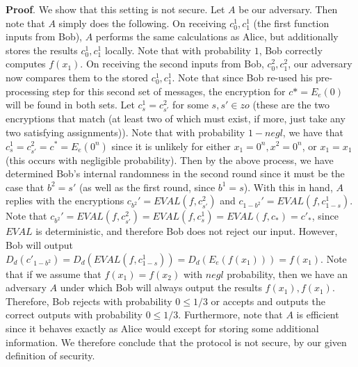 \documentclass{article}
\begin{document}
\begin{enumerate}[noitemsep,topsep=\mdcompacttopsep,label=\alph*.]
\begin{mdbmarginx}{1ex}{0pt}{1ex}{0pt}%
\noindent{}\textbf{Proof}.  We show that this setting is not secure. Let $A$ be our adversary. Then note that $A$ simply does
the following. On receiving $c_0^1,c_1^1$ (the first function inputs from Bob), $A$ performs
the same calculations as Alice, but additionally stores the results $c_0^1,c_1^1$ locally. Note that
with probability $1$, Bob correctly computes $f(x_1)$. On receiving
the second inputs from Bob, $c_0^2,c_1^2$, our adversary now compares them to the stored $c_0^1,c_1^1$.
Note that since Bob re-used his pre-processing step for this second set of messages, the encryption
for $c* =E_e(0)$ will be found in both sets. Let $c_s^1 = c_{s'}^2$ for some $s,s' \in zo$ (these
are the two encryptions that match (at least two of which must exist, if more, just take any two
satisfying assignments)). Note that with probability $1- negl$, we have that $c_s^1 = c_{s'}^2 = c^* = E_e(0^n)$
since it is unlikely for either $x_1 = 0^n, x^2 = 0^n$, or $x_1 = x_1$ (this occurs with negligible probability).
Then by the above process, we have determined Bob's internal randomness in the second round 
since it must be the case that $b^2 = s'$ (as well as the first round, since $b^1 = s$). With this
in hand, $A$ replies with the encryptions $c_{b^2}' = EVAL(f,c_{s'}^2)$ and $c_{1-b^2}' = EVAL(f,c_{1-s}^1)$.
Note that $c_{b^2}' = EVAL(f,c_{s'}^2) = EVAL(f,c_{s}^1) = EVAL(f,c_*) = c'_*$, since $EVAL$ is 
deterministic, and therefore Bob does not reject our input. However, Bob will output
$D_d(c'_{1-b^2}) = D_d(EVAL(f,c_{1-s}^1)) = D_d(E_e(f(x_1))) = f(x_1)$. Note that 
if we assume that $f(x_1) = f(x_2)$ with $negl$ probability, then we have an adversary $A$ 
under which Bob will always output the results $f(x_1),f(x_1)$. Therefore, Bob rejects with
probability $0 \leq 1/3$ or accepts and outputs the correct outputs with probability $0 \leq 1/3$. 
Furthermore, note that $A$ is efficient since it behaves exactly as Alice would except for storing
some additional information. We therefore conclude that the protocol is not secure, by our 
given definition of security.%
\end{mdbmarginx}%


\end{enumerate}
\end{document}

